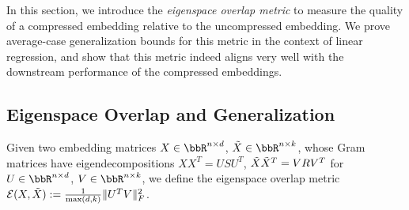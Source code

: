 
In this section, we introduce the \textit{eigenspace overlap metric} to measure the quality of a compressed embedding relative to the uncompressed embedding.
We prove average-case generalization bounds for this metric in the context of linear regression, and show that this metric indeed aligns very well with the downstream performance of the compressed embeddings.

\subsection{Eigenspace Overlap and Generalization}
\label{subsec:eigen_overlap}
\begin{definition}
Given two embedding matrices $X \in \RR^{n \times d}$, $\tX \in \RR^{n \times k}$, whose Gram matrices have eigendecompositions $XX^T = USU^T$, $\tX\tX^T = VRV^T$ for $U \in \RR^{n\times d}$, $V\in \RR^{n \times k}$, we define the eigenspace overlap metric $\eigover(X,\tX) \defeq  \frac{1}{\max(d,k)}\|U^T V\|_F^2$.
\end{definition}


